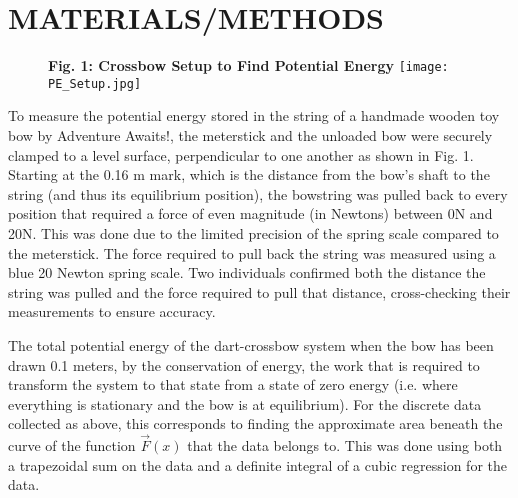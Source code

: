 \documentclass[twocolumn, 10pt]{article}
\begin{document}
 \section*{MATERIALS/METHODS}
 \begin{figure}[h]
    \centering
    \textbf{Fig. 1: Crossbow Setup to Find Potential Energy}
    \texttt{[image: PE\_Setup.jpg]}
\end{figure}
\hspace{\parindent} To measure the potential energy stored in the string of a handmade wooden toy bow by Adventure Awaits!, the meterstick and the unloaded bow were securely clamped to a level surface, perpendicular to one another as shown in Fig. 1. Starting at the 0.16 m mark, which is the distance from the bow's shaft to the string (and thus its equilibrium position), the bowstring was pulled back to every position that required a force of even magnitude (in Newtons) between 0N and 20N. This was done due to the limited precision of the spring scale compared to the meterstick. The force required to pull back the string was measured using a blue 20 Newton spring scale. Two individuals confirmed both the distance the string was pulled and the force required to pull that distance, cross-checking their measurements to ensure accuracy. \par
The total potential energy of the dart-crossbow system when the bow has been drawn 0.1 meters, by the conservation of energy, the work that is required to transform the system to that state from a state of zero energy (i.e. where everything is stationary and the bow is at equilibrium). For the discrete data collected as above, this corresponds to finding the approximate area beneath the curve of the function $\vec{F}(x)$ that the data belongs to. This was done using both a trapezoidal sum on the data and a definite integral of a cubic regression for the data. \par
\end{document}

